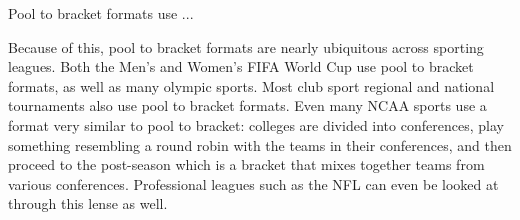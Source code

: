 {    Pool to bracket formats use ...

    Because of this, pool to bracket formats are nearly ubiquitous across sporting leagues. Both the Men's and Women's FIFA World Cup use pool to bracket formats, as well as many olympic sports. Most club sport regional and national tournaments also use pool to bracket formats. Even many NCAA sports use a format very similar to pool to bracket: colleges are divided into conferences, play something resembling a round robin with the teams in their conferences, and then proceed to the post-season which is a bracket that mixes together teams from various conferences. Professional leagues such as the NFL can even be looked at through this lense as well.


}